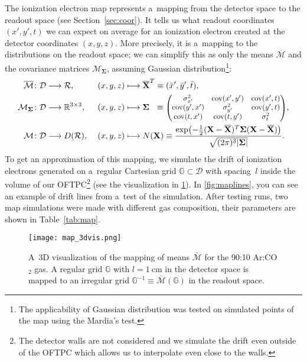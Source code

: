 		The ionization electron map represents a~mapping from the detector space to the readout space (see Section~\ref{sec:coor}). It tells us what readout coordinates $(x',y',t)$ we can expect on average for an ionization electron created at the detector coordinates $(x,y,z)$. More precisely, it is a~mapping to the distributions on the readout space; we can simplify this as only the means $\overline{\mathcal{M}}$ and the covariance matrices $\mathcal{M}_\mathbf{\Sigma}$, assuming Gaussian distribution\footnote{The applicability of Gaussian distribution was tested on simulated points of the map using the Mardia's test.}:
			\begin{alignat}{3}
				\overline{\mathcal{M}}&\colon \mathcal{D} \longrightarrow \mathcal{R}, &&(x,y,z) \longmapsto \mathbf{\overline{X}}^T\equiv(\bar{x}',\bar{y}',\bar{t}),\\
				\mathcal{M}_\mathbf{\Sigma}&\colon \mathcal{D} \longrightarrow \mathbb{R}^{3\times3}, &&(x,y,z) \longmapsto \mathbf{\Sigma}^{\phantom{T}} \equiv \scalebox{0.9}{$\begin{pmatrix}
					\sigma_{x'}^2 & \operatorname{cov}(x',y') & \operatorname{cov}(x',t) \\
					\operatorname{cov}(y',x') & \sigma_{y'}^2 & \operatorname{cov}(y',t) \\
					\operatorname{cov}(t,x') & \operatorname{cov}(t,y') & \sigma_{t}^2
				\end{pmatrix}$},\\
				\mathcal{M}&\colon \mathcal{D} \longrightarrow D(\mathcal{R}),\ &&(x,y,z) \longmapsto N(\mathbf{X}) \equiv \frac{\exp(-\frac{1}{2}(\mathbf{X}-\mathbf{\overline{X}})^T\mathbf{\Sigma}(\mathbf{X}-\mathbf{\overline{X}}))}{\sqrt{(2\pi)^3 |\mathbf{\Sigma}|}}.
			\end{alignat}
		To get an approximation of this mapping, we simulate the drift of ionization electrons generated on a~regular Cartesian grid $\mathbb{G}\subset\mathcal{D}$ with spacing~$l$ inside the volume of our \ac{OFTPC}\footnote{The detector walls are not considered and we simulate the drift even outside of the \ac{OFTPC} which allows us to interpolate even close to the walls.} (see the visualization in \cref{fig:map_3d}). In \cref{fig:maplines}, you can see an example of drift lines from a~test of the simulation. After testing runs, two map simulations were made with different gas composition, their parameters are shown in Table~\ref{tab:map}. 
		
		\begin{figure}
			\centering
			\texttt{[image: map\_3dvis.png]}
			\caption{A~3D visualization of the mapping of means $\overline{\mathcal{M}}$ for the 90:10 Ar:CO$_2$ gas. A regular grid $\mathbb{G}$ with $l = \SI{1}{\centi\meter}$ in the detector space is mapped to an irregular grid $\mathbb{G}^{-1} \equiv \overline{\mathcal{M}}(\mathbb{G})$ in the readout space.}
			\label{fig:map_3d}
		\end{figure}
		
